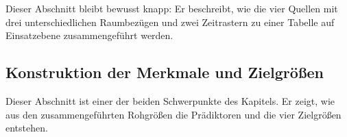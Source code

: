\documentclass[12pt,a4paper]{article}
\begin{document}
Dieser Abschnitt bleibt bewusst knapp: Er beschreibt, wie die vier Quellen mit
drei unterschiedlichen Raumbezügen und zwei Zeitrastern zu einer Tabelle auf
Einsatzebene zusammengeführt werden.


\subsection{Konstruktion der Merkmale und Zielgrößen}
\label{sec:merkmale}

Dieser Abschnitt ist einer der beiden Schwerpunkte des Kapitels. Er zeigt, wie
aus den zusammengeführten Rohgrößen die Prädiktoren und die vier Zielgrößen
entstehen.
\end{document}

